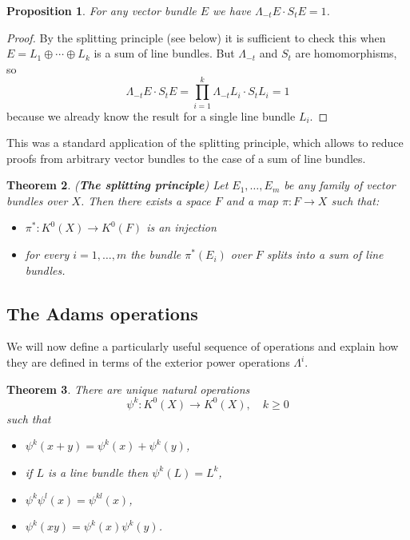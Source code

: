 \documentclass[a4paper,10pt]{article}
\theoremstyle{plain}%
\newtheorem{thm}{Theorem}
\newtheorem{prop}[thm]{Proposition}
\theoremstyle{definition}
\theoremstyle{remark}
\begin{document}
\begin{prop}
For any vector bundle $E$ we have $\Lambda_{-t}E\cdot S_t E=1$.
\end{prop}
\begin{proof}
By the splitting principle (see below) it is sufficient to check this when $E=L_1\oplus\cdots\oplus L_k$ is a sum of line bundles. But $\Lambda_{-t}$ and $S_t$ are homomorphisms, so
$$\Lambda_{-t}E\cdot S_t E=\prod_{i=1}^k\Lambda_{-t}L_i\cdot S_t L_i=1$$
because we already know the result for a single line bundle $L_i$.
\end{proof}

This was a standard application of the splitting principle, which allows to reduce proofs from arbitrary vector bundles to the case of a sum of line bundles.

\begin{thm}({\bf The splitting principle})
Let $E_1,\ldots,E_m$ be any family of vector bundles over $X$. Then there exists a space $F$ and a map $\pi: F\to X$ such that:
\begin{itemize}
\item $\pi^*: K^0(X)\to K^0(F)$ is an injection
\item for every $i=1,\ldots,m$ the bundle $\pi^*(E_i)$ over $F$ splits into a sum of line bundles.
\end{itemize}
\end{thm}



\subsection{The Adams operations}

We will now define a particularly useful sequence of operations and explain how they are defined in terms of the exterior power operations $\Lambda^i$.

\begin{thm}
There are unique natural operations
$$\psi^k: K^0(X)\to K^0(X), \quad k\geq 0$$
such that
\begin{itemize}
\item $\psi^k(x+y)=\psi^k(x)+\psi^k(y)$,
\item if $L$ is a line bundle then $\psi^k(L)=L^k$,
\item $\psi^k\psi^l(x)=\psi^{kl}(x)$,
\item $\psi^k(xy)=\psi^k(x)\psi^k(y)$.
\end{itemize}
\end{thm}
\end{document}
